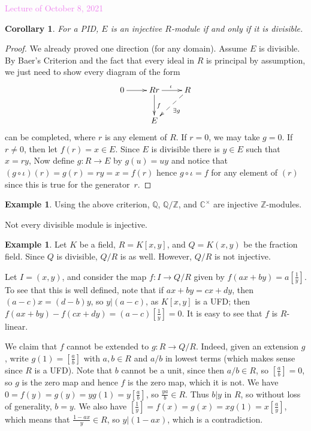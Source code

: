 \documentclass{amsart}[12pt]
\newcommand{\Oct}[1]{\textcolor{violet}{Lecture of October #1, 2021}}
\newcommand{\Q}{\mathbb{Q}}
\newcommand{\C}{\mathbb{C}}
\newcommand{\Z}{\mathbb{Z}}
\numberwithin{equation}{section}
\theoremstyle{plain} %
\newtheorem{cor}[equation]{Corollary}
\theoremstyle{definition}
\newtheorem{ex}[equation]{Example}
\theoremstyle{remark}
\begin{document}
\Oct{8}

\begin{cor} For a PID, $E$ is an injective $R$-module if and only if it is divisible.
\end{cor}

\begin{proof} We already proved one direction (for any domain). 
Assume $E$ is divisible. By Baer's Criterion and the fact that every ideal in $R$ is principal by assumption, we just need to show every diagram of the form
$$
\xymatrix{
0 \ar[r] & Rr \ar[d]^f \ar[r]^\iota & R \ar@{-->}[dl]^{\exists g} \\ 
& E \\
}
$$
can be completed, where $r$ is any element of $R$. If $r = 0$, we may take $g = 0$. If $r \ne 0$, then let $f(r)=x\in E$. Since $E$ is divisible there is $y\in E$ such that $x=ry$, Now define $g:R\to E$ by $g(u)=uy$ and notice that $(g\circ\iota)(r)=g(r)=ry=x=f(r)$ hence $g\circ\iota=f$ for any element of $(r)$ since this is true for the generator~$r$.
\end{proof}

\begin{ex} Using the above criterion, $\Q$, $\Q/\Z$, and $\C^\times$ 
are injective $\Z$-modules.  
\end{ex}

Not every divisible module is injective.

\begin{ex}
Let $K$ be a field,  $R=K[x,y]$, and $Q=K(x,y)$ be the fraction field. Since $Q$ is divisible, $Q/R$ is as well. However, $Q/R$ is not injective.

Let $I=(x,y)$, and consider the map $f:I\to Q/R$ given by $f(ax+by)=a [\frac{1}{y}]$. To see that this is well defined, note that if $ax+by=cx+dy$, then $(a-c)x=(d-b)y$, so $y|(a-c)$, as $K[x,y]$ is a UFD; then $f(ax+by)-f(cx+dy) = (a-c)[\frac{1}{y}] =0$. It is easy to see that $f$ is $R$-linear.

We claim that $f$ cannot be extended to $g:R\to Q/R$. Indeed, given an extension $g$, write $g(1)=[\frac{a}{b}]$ with $a,b\in R$  and $a/b$ in lowest terms (which makes sense since $R$ is a UFD). Note that $b$ cannot be a unit, since then $a/b\in R$, so $[\frac ab]=0$, so $g$ is the zero map and hence $f$ is the zero map, which it is not. We have $0=f(y) = g(y) = y g(1) = y [\frac{a}{b}]$, so $\frac{ya}{b}\in R$. Thus $b|y$ in $R$, so without loss of generality, $b=y$. We also have $ [\frac{1}{y}]= f(x) = g(x) = x g(1)= x[\frac ay]$, which means that $ \frac{1-ax}{y} \in R$, so $y|(1-ax)$, which is a contradiction. 
\end{ex}
\end{document}

